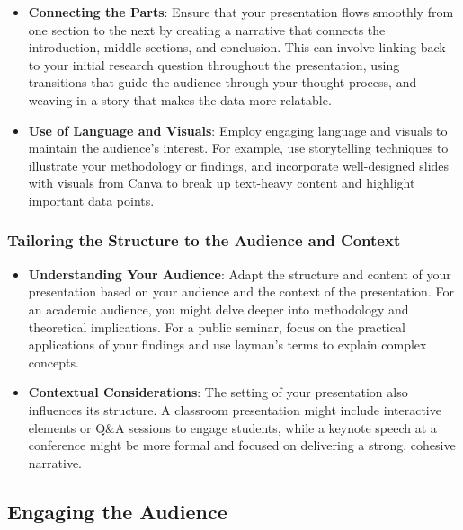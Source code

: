 \documentclass[
]{book}
\begin{document}
\begin{itemize}
\item
  \textbf{Connecting the Parts}: Ensure that your presentation flows smoothly from one section to the next by creating a narrative that connects the introduction, middle sections, and conclusion. This can involve linking back to your initial research question throughout the presentation, using transitions that guide the audience through your thought process, and weaving in a story that makes the data more relatable.
\item
  \textbf{Use of Language and Visuals}: Employ engaging language and visuals to maintain the audience's interest. For example, use storytelling techniques to illustrate your methodology or findings, and incorporate well-designed slides with visuals from Canva to break up text-heavy content and highlight important data points.
\end{itemize}

\hypertarget{tailoring-the-structure-to-the-audience-and-context}{%
\subsubsection{Tailoring the Structure to the Audience and Context}\label{tailoring-the-structure-to-the-audience-and-context}}

\begin{itemize}
\item
  \textbf{Understanding Your Audience}: Adapt the structure and content of your presentation based on your audience and the context of the presentation. For an academic audience, you might delve deeper into methodology and theoretical implications. For a public seminar, focus on the practical applications of your findings and use layman's terms to explain complex concepts.
\item
  \textbf{Contextual Considerations}: The setting of your presentation also influences its structure. A classroom presentation might include interactive elements or Q\&A sessions to engage students, while a keynote speech at a conference might be more formal and focused on delivering a strong, cohesive narrative.
\end{itemize}

\hypertarget{engaging-the-audience}{%
\subsection*{Engaging the Audience}\label{engaging-the-audience}}
\end{document}
